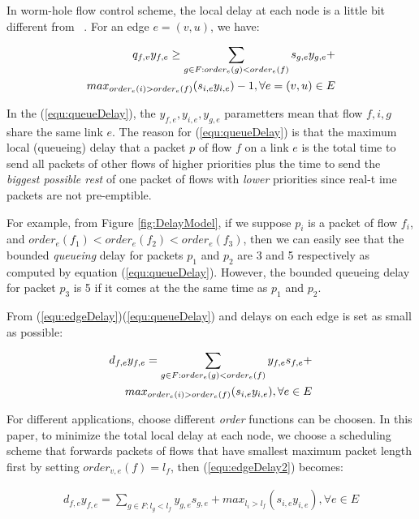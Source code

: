 \documentclass[conference, twocolumn]{IEEEtran}
\theoremstyle{definition}
\begin{document}
In worm-hole flow control scheme, the local delay at each node is a little bit
different from ~\cite{Ferrari90ascheme}. For an edge $e = (v,u)$, we have:

\begin{eqnarray}\label{equ:queueDelay}
q_{f,v}y_{f,e} \geq \sum_{g \in F:order_{e}(g) <
order_{e}(f)}s_{g,e}y_{g,e} + \notag \\ 
max_{order_{e}(i)>order_{e}(f)}(s_{i,e}y_{i,e})-1, \forall e = (v,u)
\in E
\end{eqnarray}

In the (\ref{equ:queueDelay}), the $y_{f,e}, y_{i,e}, y_{g,e}$ parametters mean
that flow $f, i, g$ share the same link $e$. The reason for
(\ref{equ:queueDelay}) is that the maximum local (queueing) delay  that a packet
$p$ of flow $f$ on a link $e$ is the total time to send all packets of other
flows of higher priorities plus  the time  to send the {\em biggest
possible rest} of one packet of flows with {\em lower} priorities since real-t
ime packets are not pre-emptible.

For example, from Figure \ref{fig:DelayModel}, if we suppose $p_i$ is a packet
of flow $f_i$, and $order_{e}(f_1) < order_{e}(f_2) < order_{e}(f_3)$, then we can easily see that
the bounded {\em queueing} delay for packets $p_1$ and $p_2$ are 3 and 5
respectively as computed by equation (\ref{equ:queueDelay}). However, the
bounded queueing delay for packet $p_3$ is 5 if it comes at the the same time as $p_1$ and $p_2$.

From (\ref{equ:edgeDelay})(\ref{equ:queueDelay}) and delays on
each edge is set as small as possible:

\begin{eqnarray}\label{equ:edgeDelay2}
d_{f,e}y_{f,e} = \sum_{g \in F:order_e(g) < order_e(f)}y_{f,e}s_{f,e} +
\notag\\  
max_{order_{e}(i)>order_{e}(f)}(s_{i,e}y_{i,e}), \forall e \in E
\end{eqnarray}

For different applications, choose different {\em order} functions can be
choosen. In this paper, to minimize the total local delay at each node, we
choose a scheduling scheme that forwards packets of flows that have smallest maximum
packet length first by setting $order_{v,e}(f)=l_f$, then
(\ref{equ:edgeDelay2}) becomes:

\begin{eqnarray}\label{equ:edgeDelayPacketLength}
d_{f,e}y_{f,e} = \sum_{g \in F:l_g <
l_f}y_{g,e}s_{g,e} +max_{l_i>l_f}(s_{i,e}y_{i,e}), \forall e \in E
\end{eqnarray}
\end{document}

